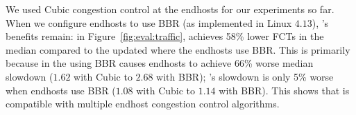 
We used Cubic congestion control at the endhosts for our experiments so far. When we configure endhosts to use BBR (as implemented in Linux $4.13$), \name's benefits remain: in Figure~\ref{fig:eval:traffic}, \name achieves 58\% lower FCTs in the median compared to the updated \baseline where the endhosts use BBR. 
This is primarily because in the \baseline using BBR causes endhosts to achieve 66\% worse median slowdown ($1.62$ with Cubic to $2.68$ with BBR); \name's slowdown is only 5\% worse when endhosts use BBR ($1.08$ with Cubic to $1.14$ with BBR). 
This shows that \name is compatible with multiple endhost congestion control algorithms.
